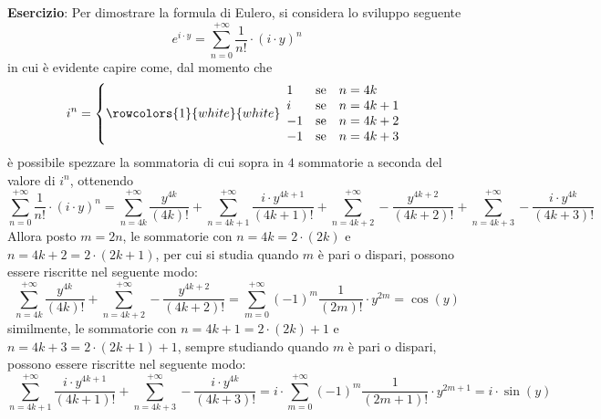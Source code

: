 \documentclass[a4paper]{extarticle}
\begin{document}
\vspace{2em}
\noindent
\textbf{Esercizio}: Per dimostrare la formula di Eulero, si considera lo sviluppo seguente
\[e^{i \cdot y} = \sum_{n=0}^{+\infty} \frac{1}{n!} \cdot (i \cdot y)^n\]
in cui è evidente capire come, dal momento che
\[i^n = \left\{
    \rowcolors{1}{white}{white}
    \begin{array}{lll}
        1 & \text{se} & n=4k\\
        i & \text{se} & n=4k+1\\
        -1 & \text{se} & n=4k+2\\
        -1 & \text{se} & n=4k+3\\
    \end{array}
\right.\]
è possibile spezzare la sommatoria di cui sopra in $4$ sommatorie a seconda del valore di $i^n$, ottenendo
\[\sum_{n=0}^{+\infty} \frac{1}{n!} \cdot (i \cdot y)^n = \sum_{n=4k}^{+\infty} \frac{y^{4k}}{(4k)!} + \sum_{n=4k+1}^{+\infty} \frac{i \cdot y^{4k+1}}{(4k+1)!} + \sum_{n=4k+2}^{+\infty} -\frac{y^{4k+2}}{(4k+2)!} + \sum_{n=4k+3}^{+\infty} -\frac{i \cdot y^{4k}}{(4k+3)!}\]
Allora posto $m=2n$, le sommatorie con $n=4k=2 \cdot (2k)$ e $n=4k+2=2 \cdot (2k+1)$, per cui si studia quando $m$ è pari o dispari, possono essere riscritte nel seguente modo:
\[\sum_{n=4k}^{+\infty} \frac{y^{4k}}{(4k)!} + \sum_{n=4k+2}^{+\infty} -\frac{y^{4k+2}}{(4k+2)!} = \sum_{m=0}^{+\infty} (-1)^m \frac{1}{(2m)!} \cdot y^{2m} = \cos(y)\]
similmente, le sommatorie con $n=4k+1=2 \cdot (2k)+1$ e $n=4k+3=2 \cdot (2k+1) + 1$, sempre studiando quando $m$ è pari o dispari, possono essere riscritte nel seguente modo:
\[\sum_{n=4k+1}^{+\infty} \frac{i \cdot y^{4k+1}}{(4k+1)!} +\sum_{n=4k+3}^{+\infty} -\frac{i \cdot y^{4k}}{(4k+3)!} = i \cdot \sum_{m=0}^{+\infty} (-1)^m \frac{1}{(2m+1)!} \cdot y^{2m+1} = i \cdot \sin(y)\]

\newpage
\end{document}
